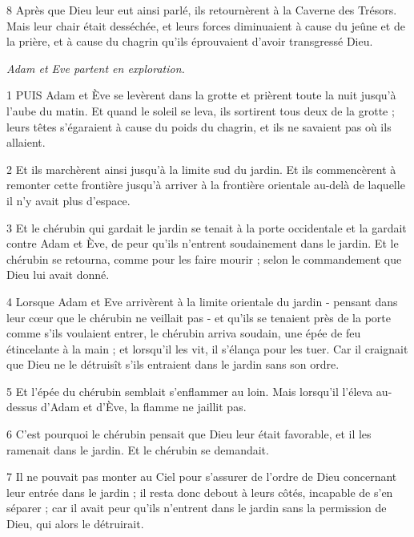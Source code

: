 \par 8 Après que Dieu leur eut ainsi parlé, ils retournèrent à la Caverne des Trésors. Mais leur chair était desséchée, et leurs forces diminuaient à cause du jeûne et de la prière, et à cause du chagrin qu'ils éprouvaient d'avoir transgressé Dieu.


\par \textit{Adam et Eve partent en exploration.}

\par 1 PUIS Adam et Ève se levèrent dans la grotte et prièrent toute la nuit jusqu'à l'aube du matin. Et quand le soleil se leva, ils sortirent tous deux de la grotte ; leurs têtes s'égaraient à cause du poids du chagrin, et ils ne savaient pas où ils allaient.

\par 2 Et ils marchèrent ainsi jusqu'à la limite sud du jardin. Et ils commencèrent à remonter cette frontière jusqu'à arriver à la frontière orientale au-delà de laquelle il n'y avait plus d'espace.

\par 3 Et le chérubin qui gardait le jardin se tenait à la porte occidentale et la gardait contre Adam et Ève, de peur qu'ils n'entrent soudainement dans le jardin. Et le chérubin se retourna, comme pour les faire mourir ; selon le commandement que Dieu lui avait donné.

\par 4 Lorsque Adam et Eve arrivèrent à la limite orientale du jardin - pensant dans leur cœur que le chérubin ne veillait pas - et qu'ils se tenaient près de la porte comme s'ils voulaient entrer, le chérubin arriva soudain, une épée de feu étincelante à la main ; et lorsqu'il les vit, il s'élança pour les tuer. Car il craignait que Dieu ne le détruisît s'ils entraient dans le jardin sans son ordre.

\par 5 Et l'épée du chérubin semblait s'enflammer au loin. Mais lorsqu’il l’éleva au-dessus d’Adam et d’Ève, la flamme ne jaillit pas.

\par 6 C'est pourquoi le chérubin pensait que Dieu leur était favorable, et il les ramenait dans le jardin. Et le chérubin se demandait.

\par 7 Il ne pouvait pas monter au Ciel pour s'assurer de l'ordre de Dieu concernant leur entrée dans le jardin ; il resta donc debout à leurs côtés, incapable de s'en séparer ; car il avait peur qu'ils n'entrent dans le jardin sans la permission de Dieu, qui alors le détruirait.

